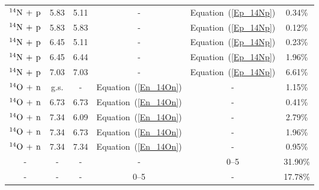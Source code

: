 \begin{table}[h]
\begin{tabular}{cccccc}
		$^{14}{\rm N}\,+\,{\rm p}$ & 5.83          & 5.11          & -                        & Equation~(\ref{Ep_14Np}) & 0.34\%      \\
		$^{14}{\rm N}\,+\,{\rm p}$ & 5.83          & 5.83          & -                        & Equation~(\ref{Ep_14Np}) & 0.12\%      \\
		$^{14}{\rm N}\,+\,{\rm p}$ & 6.45          & 5.11          & -                        & Equation~(\ref{Ep_14Np}) & 0.23\%      \\
		$^{14}{\rm N}\,+\,{\rm p}$ & 6.45          & 6.44          & -                        & Equation~(\ref{Ep_14Np}) & 1.96\%      \\
		$^{14}{\rm N}\,+\,{\rm p}$ & 7.03          & 7.03          & -                        & Equation~(\ref{Ep_14Np}) & 6.61\%      \\
		$^{14}{\rm O}\,+\,{\rm n}$ & g.s.          & -             & Equation~(\ref{En_14On}) & -                        & 1.15\%      \\
		$^{14}{\rm O}\,+\,{\rm n}$ & 6.73          & 6.73          & Equation~(\ref{En_14On}) & -                        & 0.41\%      \\
		$^{14}{\rm O}\,+\,{\rm n}$ & 7.34          & 6.09          & Equation~(\ref{En_14On}) & -                        & 2.79\%      \\
		$^{14}{\rm O}\,+\,{\rm n}$ & 7.34          & 6.73          & Equation~(\ref{En_14On}) & -                        & 1.96\%      \\
		$^{14}{\rm O}\,+\,{\rm n}$ & 7.34          & 7.34          & Equation~(\ref{En_14On}) & -                        & 0.95\%      \\
		-                          & -             & -             & -                        & 0--5                     & 31.90\%     \\
		-                          & -             & -             & 0--5                     & -                        & 17.78\%     \\ \hline \hline
	\end{tabular}
\end{table}

